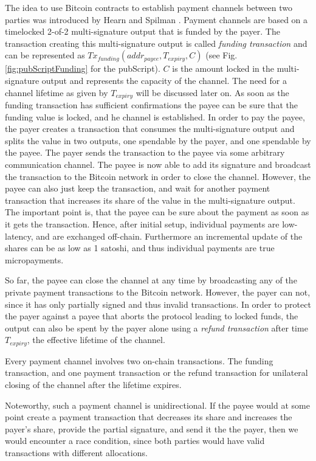 The idea to use Bitcoin contracts to establish payment channels between two parties was introduced by Hearn and Spilman \parencite{Hearn2013,Spilman2013}. Payment channels are based on a timelocked 2-of-2 multi-signature output that is funded by the payer. The transaction creating this multi-signature output is called \emph{funding transaction} and can be represented as $Tx_{funding}(addr_{payee},T_{expiry},C)$ (see Fig. \ref{fig:pubScriptFunding} for the pubScript). $C$ is the amount locked in the multi-signature output and represents the capacity of the channel. The need for a channel lifetime as given by $T_{expiry}$ will be discussed later on.
As soon as the funding transaction has sufficient confirmations the payee can be sure that the funding value is locked, and he channel is established. In order to pay the payee, the payer creates a transaction that consumes the multi-signature output and splits the value in two outputs, one spendable by the payer, and one spendable by the payee. The payer sends the transaction to the payee via some arbitrary communication channel. The payee is now able to add its signature and broadcast the transaction to the Bitcoin network in order to close the channel. However, the payee can also just keep the transaction, and wait for another payment transaction that increases its share of the value in the multi-signature output. The important point is, that the payee can be sure about the payment as soon as it gets the transaction. Hence, after initial setup, individual payments are low-latency, and are exchanged off-chain. Furthermore an incremental update of the shares can be as low as 1 satoshi, and thus individual payments are true micropayments. 

So far, the payee can close the channel at any time by broadcasting any of the private payment transactions to the Bitcoin network. However, the payer can not, since it has only partially signed and thus invalid transactions. In order to protect the payer against a payee that aborts the protocol leading to locked funds, the output can also be spent by the payer alone using a \emph{refund transaction} after time $T_{expiry}$, the effective lifetime of the channel.

Every payment channel involves two on-chain transactions. The funding transaction, and one payment transaction or the refund transaction for unilateral closing of the channel after the lifetime expires.

Noteworthy, such a payment channel is unidirectional. If the payee would at some point create a payment transaction that decreases its share and increases the payer's share, provide the partial signature, and send it the the payer, then we would encounter a race condition, since both parties would have valid transactions with different allocations. 

